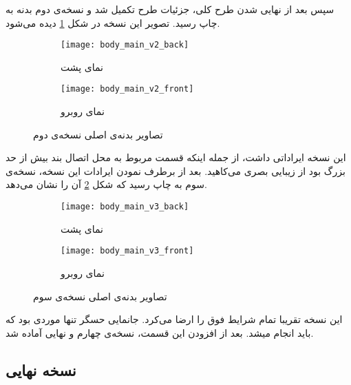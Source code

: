سپس بعد از نهایی شدن طرح کلی، جزئیات طرح تکمیل شد و نسخه‌ی دوم بدنه به چاپ رسید. تصویر این نسخه در شکل \ref{fig:body-v2} دیده می‌شود.

\begin{figure}[h]
	\centering
	\begin{subfigure}{0.44\textwidth}
		\centering
		\texttt{[image: body\_main\_v2\_back]}
		\caption{نمای پشت}
	\end{subfigure}
	\begin{subfigure}{0.44\textwidth}
		\centering
		\texttt{[image: body\_main\_v2\_front]}
		\caption{نمای روبرو}
	\end{subfigure}
	\caption{تصاویر بدنه‌ی اصلی نسخه‌ی دوم}
	\label{fig:body-v2}
\end{figure}

این نسخه ایراداتی داشت، از جمله اینکه قسمت مربوط به محل اتصال بند بیش از حد بزرگ بود از زیبایی بصری می‌کاهید. بعد از برطرف نمودن ایرادات این نسخه، نسخه‌ی سوم به چاپ رسید که شکل \ref{fig:body-v3} آن را نشان می‌دهد.

\begin{figure}[h]
	\centering
	\begin{subfigure}{0.44\textwidth}
		\centering
		\texttt{[image: body\_main\_v3\_back]}
		\caption{نمای پشت}
	\end{subfigure}
	\begin{subfigure}{0.44\textwidth}
		\centering
		\texttt{[image: body\_main\_v3\_front]}
		\caption{نمای روبرو}
	\end{subfigure}
	\caption{تصاویر بدنه‌ی اصلی نسخه‌ی سوم}
	\label{fig:body-v3}
\end{figure}

این نسخه تقریبا تمام شرایط فوق را ارضا می‌کرد. جانمایی حسگر  تنها موردی بود که باید انجام میشد. بعد از افزودن این قسمت، نسخه‌ی چهارم و نهایی آماده شد.

\subsection{نسخه نهایی}

